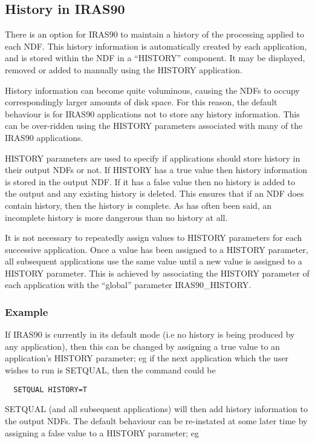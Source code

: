 \subsection{History in IRAS90}
\label{SEC:HIS}
There is an option for {\small IRAS90} to maintain a history of the
processing applied to each {\small NDF}. This history information is
automatically created by each application, and is
stored within the {\small NDF} in a ``{\small HISTORY}'' component. It may be
displayed, removed or added to manually using the {\small HISTORY}
application. 

History information can become quite voluminous, causing the {\small NDF}s
to occupy correspondingly larger amounts of disk space. For this
reason, the default behaviour is for {\small IRAS90} applications not to
store any history information. This can be over-ridden using the
{\small HISTORY} parameters associated with many of the {\small IRAS90}
applications. 

{\small HISTORY} parameters are used to specify if applications should
store history in their output {\small NDF}s or not. If {\small HISTORY} has a true
value then history information is stored in the output {\small NDF}. If
it has a false value then no history is added to the output and
any existing history is deleted. This ensures that if an {\small NDF}
does contain history, then the history is complete. As has often
been said, an incomplete history is more dangerous than no
history at all. 

It is not necessary to repeatedly assign values to {\small HISTORY}
parameters for each successive application. Once a value has
been assigned to a {\small HISTORY} parameter, all subsequent
applications use the same value until a new value is assigned
to a {\small HISTORY} parameter. This is achieved by associating the
{\small HISTORY} parameter of each application with the ``global''
parameter {\small IRAS90\_HISTORY}. 

\subsubsection{Example}
If {\small IRAS90} is currently in its default mode (i.e no history is
being produced by any application), then this can be changed by
assigning a true value to an application's {\small HISTORY} parameter; eg
if the next application which the user wishes to run is {\small SETQUAL}, 
then the command could be

\small
\begin{verbatim}
  SETQUAL HISTORY=T
\end{verbatim}
\normalsize
{\small SETQUAL} (and all subsequent applications) will then add history
information to the output {\small NDF}s. The default behaviour can be 
re-instated at some later time by assigning a false value to a 
{\small HISTORY} parameter; eg

